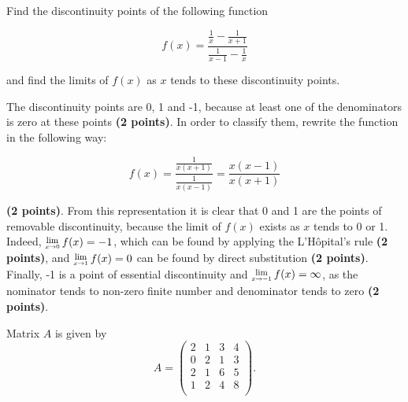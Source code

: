 \documentclass[addpoints, answers]{exam} %
\newcommand{\Lim}[1]{\raisebox{0.5ex}{\scalebox{0.8}{$\displaystyle \lim_{#1}\;$}}}
\begin{document}
\begin{questions}
\question[10] Find the discontinuity points of the following function

\[
f(x) = \frac{\frac{1}{x}-\frac{1}{x+1}}{\frac{1}{x-1}-\frac{1}{x}}
\]

and find the limits of $f(x)$ as $x$ tends to these discontinuity points.

\begin{solution}

The discontinuity points are 0, 1 and -1, because at least one of the denominators is zero at these points \textbf{(2 points)}. In order to classify them, rewrite the function in the following way:

\[
f(x) = \frac{\frac{1}{x (x+1)}}{\frac{1}{x (x-1)}} = \frac{x (x-1)}{x (x+1)}
\]

\noindent \textbf{(2 points)}. From this representation it is clear that 0 and 1 are the points of removable discontinuity, because the limit of $f(x)$ exists as $x$ tends to 0 or 1. Indeed, $\Lim{x \rightarrow 0} f(x) = -1$, which can be found by applying the L'Hôpital's rule \textbf{(2 points)}, and $\Lim{x \rightarrow 1} f(x) = 0$ can be found by direct substitution \textbf{(2 points)}. Finally, -1 is a point of essential discontinuity and $\Lim{x \rightarrow -1} f(x) = \infty$, as the nominator tends to non-zero finite number and denominator tends to zero \textbf{(2 points)}.

\end{solution}




\question Matrix $A$ is given by
\[
A=\begin{pmatrix}
  2 & 1 & 3 & 4 \\
  0 & 2 & 1 & 3 \\
  2 & 1 & 6 & 5 \\
  1 & 2 & 4 & 8 \\
\end{pmatrix}.
\]

\end{questions}
\end{document}
